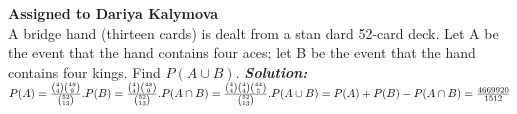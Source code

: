 \documentclass[12pt, a4paper]{article}
\begin{document}
\noindent\textbf{Assigned to Dariya Kalymova}\\

\noindent A bridge hand (thirteen cards) is dealt from a stan dard 52-card deck. Let A be the event that the hand contains four aces; let B be the event that the hand contains four kings. Find
\begin{math}
 P(A \cup B).
 \end{math}
\newline
\textit{\textbf{Solution:}}
\begin{math}
 P(A) = \frac{\binom{4}{4} \binom{48}{9}}{\binom{52}{13}}.\newline 
  P(B) = \frac{\binom{4}{4} \binom{48}{9}}{\binom{52}{13}}.\newline
   P(A \cap B) = \frac{\binom{4}{4} \binom{4}{4} \binom{44}{5}}{\binom{52}{13}}.\newline
  P(A \cup B) = P(A) + P(B)- P(A \cap B) = \frac{4 669 920}{1512}
\end{math}

\newpage
\printbibliography
\end{document}
